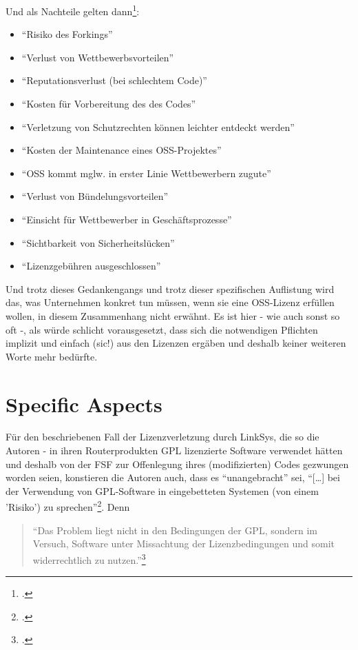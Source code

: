 \documentclass[DIV=calc,BCOR=5mm,11pt,headings=small,oneside,abstract=true, toc=bib]{scrartcl}
\begin{document}
Und als Nachteile gelten dann\footcite[vgl.][114]{BruHarPicCreFieHen2004a}:
\begin{itemize}
  \item \enquote{Risiko des Forkings}
  \item \enquote{Verlust von Wettbewerbsvorteilen}
  \item \enquote{Reputationsverlust (bei schlechtem Code)}
  \item \enquote{Kosten für Vorbereitung des des Codes}
  \item \enquote{Verletzung von Schutzrechten können leichter entdeckt
  werden}
  \item \enquote{Kosten der Maintenance eines OSS-Projektes}
  \item \enquote{OSS kommt mglw. in erster Linie Wettbewerbern zugute}
  \item \enquote{Verlust von Bündelungsvorteilen}
  \item \enquote{Einsicht für Wettbewerber in Geschäftsprozesse}
  \item \enquote{Sichtbarkeit von Sicherheitslücken}
  \item \enquote{Lizenzgebühren ausgeschlossen}
\end{itemize}

Und trotz dieses Gedankengangs und trotz dieser spezifischen Auflistung wird
das, was Unternehmen konkret tun müssen, wenn sie eine OSS-Lizenz erfüllen
wollen, in diesem Zusammenhang nicht erwähnt. Es ist hier - wie auch sonst so
oft -, als würde schlicht vorausgesetzt, dass sich die notwendigen Pflichten
implizit und einfach (sic!) aus den Lizenzen ergäben und deshalb keiner weiteren
Worte mehr bedürfte.

\section{Specific Aspects}

Für den beschriebenen Fall der Lizenzverletzung durch LinkSys, die so die
Autoren - in ihren Routerprodukten GPL lizenzierte Software verwendet hätten und
deshalb von der FSF zur Offenlegung ihres (modifizierten) Codes gezwungen worden
seien, konstieren die Autoren auch, dass es \enquote{unangebracht} sei,
\enquote{[\ldots] bei der Verwendung von GPL-Software in eingebetteten Systemen
(von einem 'Risiko') zu
sprechen}\footcite[vgl.][111]{BruHarPicCreFieHen2004a}. Denn \begin{quote}
\enquote{Das Problem liegt nicht in den Bedingungen der GPL, sondern im Versuch,
Software unter Missachtung der Lizenzbedingungen und somit widerrechtlich zu
nutzen.}\footcite[][111]{BruHarPicCreFieHen2004a}
\end{quote}
\small

\end{document}
